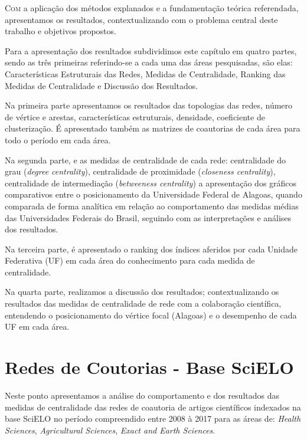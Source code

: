 
\lettrine{C}{om} a aplicação dos métodos explanados e a fundamentação teórica referendada, apresentamos os resultados, contextualizando com o problema central deste trabalho e objetivos propostos. 

Para a apresentação dos resultados subdividimos este capítulo em quatro partes, sendo as três primeiras referindo-se a cada uma das áreas pesquisadas, são elas: Características Estruturais das Redes, Medidas de Centralidade, Ranking das Medidas de Centralidade e Discussão dos Resultados.

Na primeira parte apresentamos os resultados das topologias das redes, número de vértice e arestas, características estruturais, densidade, coeficiente de clusterização. É apresentado também as matrizes de coautorias de cada área para todo o período em cada área.

Na segunda parte, e as medidas de centralidade de cada rede: centralidade do grau (\textit{degree centrality}),  centralidade de proximidade (\textit{closeness centrality}), centralidade de intermediação (\textit{betweeness centrality}) a apresentação dos gráficos comparativos entre o posicionamento da Universidade Federal de Alagoas, quando comparada de forma analítica em relação ao comportamento das medidas médias das Universidades Federais do Brasil, seguindo com as interpretações e análises dos resultados.

Na terceira parte, é apresentado o ranking dos índices aferidos por cada Unidade Federativa (UF) em cada área do conhecimento para cada medida de centralidade.

Na quarta parte, realizamos a discussão dos resultados; contextualizando os resultados das medidas de centralidade de rede com a colaboração científica, entendendo o posicionamento do vértice focal (Alagoas) e o desempenho de cada UF em cada área.

\section{\textbf{Redes de Coutorias - Base SciELO}}

Neste ponto apresentamos a análise do comportamento e dos resultados das medidas de centralidade das redes de coautoria de artigos científicos indexados na base SciELO no período compreendido entre 2008 à 2017 para as áreas de: \textit{Health Sciences}, \textit{Agricultural Sciences}, \textit{Exact and Earth Sciences}.


